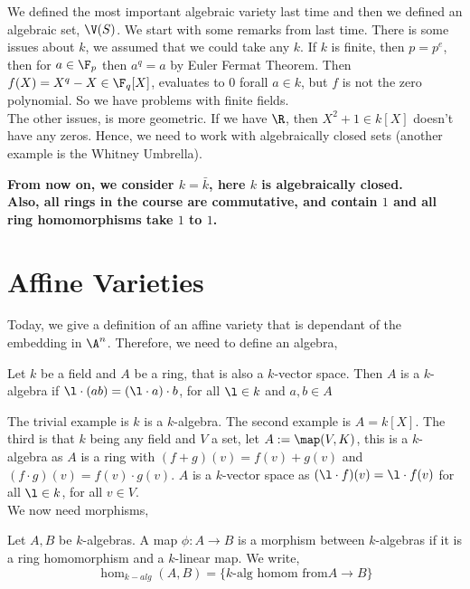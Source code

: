 
We defined the most important algebraic variety last time and then we defined an algebraic set, $\V(S)$. We start with some remarks from last time. There is some issues about $k$, we assumed that we could take any $k$. If $k$ is finite, then $p = p^e$, then for $a \in \F_p$ then $a^q = a$ by Euler Fermat Theorem. Then $f(X) = X^q - X \in \F_q[X]$, evaluates to $0$ forall $a \in k$, but $f$ is not the zero polynomial. So we have problems with finite fields.\\

\noindent
The other issues, is more geometric. If we have $\R$, then $X^2 + 1 \in k[X]$ doesn't have any zeros. Hence, we need to work with algebraically closed sets (another example is the Whitney Umbrella).
\begin{center}
  \textbf{From now on, we consider $k = \bar k$, here $k$ is algebraically closed.}\\
  \textbf{Also, all rings in the course are commutative, and contain $1$ and all ring homomorphisms take $1$ to $1$. }
\end{center}

\section{Affine Varieties}

Today, we give a definition of an affine variety that is dependant of the embedding in $\A^n$. Therefore, we need to define an algebra,
\begin{ndefi}[Algebra]
  Let $k$ be a field and $A$ be a ring, that is also a $k$-vector space. Then $A$ is a $k$-algebra if $\l \cdot (ab) = (\l \cdot a) \cdot b$, for all $\l \in k$ and $a,b \in A$
\end{ndefi}

The trivial example is $k$ is a $k$-algebra. The second example is $A = k[X]$. The third is that $k$ being any field and $V$ a set, let $A := \map (V, K)$, this is a $k$-algebra as $A$ is a ring with $(f + g)(v) = f(v) + g(v)$ and $(f \cdot g)(v) = f(v) \cdot g(v)$. $A$ is a $k$-vector space as $(\l \cdot f)(v) = \l \cdot f(v)$ for all $\l \in k$, for all $v \in V$.\\

We now need morphisms,
\begin{ndefi}
  Let $A, B$ be $k$-algebras. A map $\phi : A \to B$ is a morphism between $k$-algebras if it is a ring homomorphism and a $k$-linear map. We write,
  $$ \hom_{k-alg}(A, B) = \{k\text{-alg homom from} A \to B\} $$
\end{ndefi}

